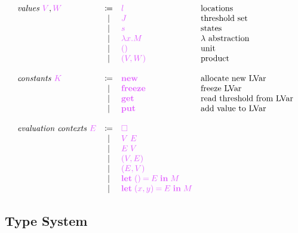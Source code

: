 \documentclass[main.tex]{subfiles}
\begin{document}
\[\begin{array}{lcll}
  \textit{values }\tm{V}, \tm{W}
  & \coloneqq & \tm{l}                        & \text{locations} \\
  & \sep      & \tm{J}                        & \text{threshold set} \\
  & \sep      & \tm{s}                        & \text{states} \\
  & \sep      & \tm{\lambda x.M}              & \lambda \text{ abstraction} \\
  & \sep      & \tm{\unit}                    & \text{unit} \\
  & \sep      & \tm{\pair{V}{W}}              & \text{product} \\
  \\
  \textit{constants }\tm{K}
  & \coloneqq & \tm{\lvarnew}                 & \text{allocate new LVar} \\
  & \sep      & \tm{\lvarfreeze}              & \text{freeze LVar} \\
  & \sep      & \tm{\lvarget}                 & \text{read threshold from
                                                  LVar} \\
  & \sep      & \tm{\lvarput}                 & \text{add value to LVar} \\
  \\
  \textit{evaluation contexts }\tm{E}
  & \coloneqq & \tm{\hole}                 \\
  & \sep      & \tm{V\; E}                 \\       
  & \sep      & \tm{E\; V}                 \\     
  & \sep      & \tm{(V, E)}                \\   
  & \sep      & \tm{(E, V)}                \\   
  & \sep      & \tm{\letunit{E}{M}}        \\                                                   
  & \sep      & \tm{\letpair{x}{y}{E}{M}}  \\   
\end{array}
\]

\subsection{Type System}%
\label{sec:llam-typing}

\end{document}
